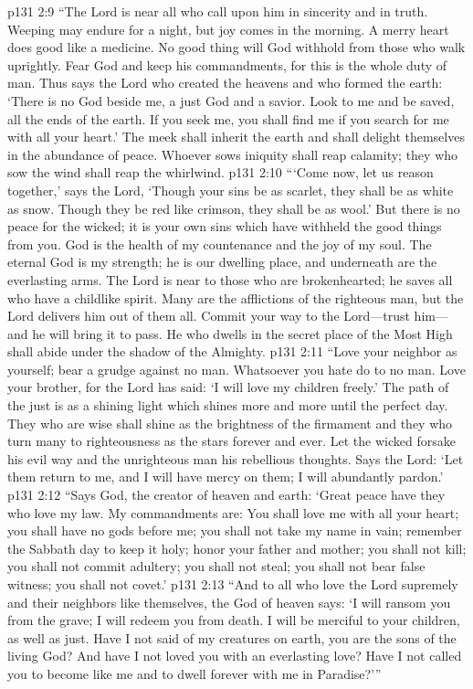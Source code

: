 \vs p131 2:9 “The Lord is near all who call upon him in sincerity and in truth. Weeping may endure for a night, but joy comes in the morning. A merry heart does good like a medicine. No good thing will God withhold from those who walk uprightly. Fear God and keep his commandments, for this is the whole duty of man. Thus says the Lord who created the heavens and who formed the earth: ‘There is no God beside me, a just God and a savior. Look to me and be saved, all the ends of the earth. If you seek me, you shall find me if you search for me with all your heart.’ The meek shall inherit the earth and shall delight themselves in the abundance of peace. Whoever sows iniquity shall reap calamity; they who sow the wind shall reap the whirlwind.\plusone
\vs p131 2:10 “‘Come now, let us reason together,’ says the Lord, ‘Though your sins be as scarlet, they shall be as white as snow. Though they be red like crimson, they shall be as wool.’ But there is no peace for the wicked; it is your own sins which have withheld the good things from you. God is the health of my countenance and the joy of my soul. The eternal God is my strength; he is our dwelling place, and underneath are the everlasting arms. The Lord is near to those who are brokenhearted; he saves all who have a childlike spirit. Many are the afflictions of the righteous man, but the Lord delivers him out of them all. Commit your way to the Lord---trust him---and he will bring it to pass. He who dwells in the secret place of the Most High shall abide under the shadow of the Almighty.\plusone
\vs p131 2:11 “Love your neighbor as yourself; bear a grudge against no man. Whatsoever you hate do to no man. Love your brother, for the Lord has said: ‘I will love my children freely.’ The path of the just is as a shining light which shines more and more until the perfect day. They who are wise shall shine as the brightness of the firmament and they who turn many to righteousness as the stars forever and ever. Let the wicked forsake his evil way and the unrighteous man his rebellious thoughts. Says the Lord: ‘Let them return to me, and I will have mercy on them; I will abundantly pardon.’
\vs p131 2:12 “Says God, the creator of heaven and earth: ‘Great peace have they who love my law. My commandments are: You shall love me with all your heart; you shall have no gods before me; you shall not take my name in vain; remember the Sabbath day to keep it holy; honor your father and mother; you shall not kill; you shall not commit adultery; you shall not steal; you shall not bear false witness; you shall not covet.’
\vs p131 2:13 “And to all who love the Lord supremely and their neighbors like themselves, the God of heaven says: ‘I will ransom you from the grave; I will redeem you from death. I will be merciful to your children, as well as just. Have I not said of my creatures on earth, you are the sons of the living God? And have I not loved you with an everlasting love? Have I not called you to become like me and to dwell forever with me in Paradise?’”\plusone
